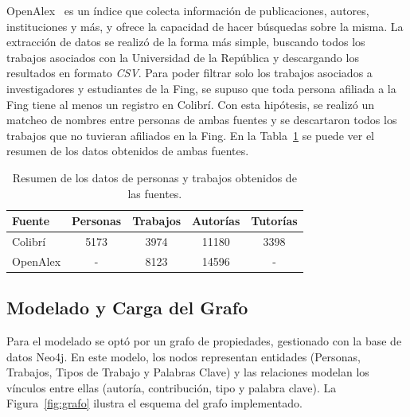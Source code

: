 \documentclass[journal]{IEEEtran}
\begin{document}
OpenAlex~\cite{Priem2022OpenAlex} es un índice que colecta información de publicaciones, autores, instituciones y más, y ofrece la capacidad de hacer búsquedas sobre la misma. La extracción de datos se realizó de la forma más simple, buscando todos los trabajos asociados con la Universidad de la República y descargando los resultados en formato \emph{CSV}. Para poder filtrar solo los trabajos asociados a investigadores y estudiantes de la Fing, se supuso que toda persona afiliada a la Fing tiene al menos un registro en Colibrí. Con esta hipótesis, se realizó un matcheo de nombres entre personas de ambas fuentes y se descartaron todos los trabajos que no tuvieran afiliados en la Fing. En la Tabla~\ref{tab:datos} se puede ver el resumen de los datos obtenidos de ambas fuentes.

\begin{table}[h]
	\centering
	\begin{tabular}{l|c|c|c|c}
		\toprule
		\textbf{Fuente} & \textbf{Personas} & \textbf{Trabajos} & \textbf{Autorías} & \textbf{Tutorías} \\
		\midrule
		Colibrí         & 5173              & 3974              & 11180             & 3398              \\
		OpenAlex        & -                 & 8123              & 14596             & -                 \\
		\midrule
	\end{tabular}
	\caption{Resumen de los datos de personas y trabajos obtenidos de las fuentes.}
	\label{tab:datos}
\end{table}

\subsection{Modelado y Carga del Grafo}
Para el modelado se optó por un grafo de propiedades, gestionado con la base de datos Neo4j. En este modelo, los nodos representan entidades (Personas, Trabajos, Tipos de Trabajo y Palabras Clave) y las relaciones modelan los vínculos entre ellas (autoría, contribución, tipo y palabra clave). La Figura~\ref{fig:grafo} ilustra el esquema del grafo implementado.
\end{document}
